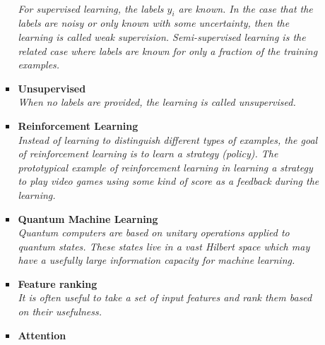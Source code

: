 \documentclass[12pt,letterpaper]{article}
\begin{document}
\begin{itemize}
\begin{itemize}
\begin{itemize}
				\\\textit{For supervised learning, the labels $y_i$ are known.  In the case that the labels are noisy or only known with some uncertainty, then the learning is called weak supervision.  Semi-supervised learning is the related case where labels are known for only a fraction of the training examples.}
				\item \textbf{Unsupervised}~\cite{Sheldon:2024sbe,Cai:2024xnt,Lu:2024ict,Kishimoto:2023cys,Badea:2023jdb,Kitouni:2023rct,Huang:2023kgs,Dillon:2021gag,Howard:2021pos,Cai:2020vzx,Dillon:2019cqt,1797846,Komiske:2019fks,Mackey:2015hwa}
				\\\textit{When no labels are provided, the learning is called unsupervised.}
				\item \textbf{Reinforcement Learning}~\cite{Nishimura:2024apb,Angloher:2023oya,Alvestad:2023jgl,Nishimura:2023wdu,Dersy:2022bym,Windisch:2021mem,Cranmer:2021gdt,Harvey:2021oue,John:2020sak,Brehmer:2020brs,Carrazza:2019efs}
				\\\textit{Instead of learning to distinguish different types of examples, the goal of reinforcement learning is to learn a strategy (policy).  The prototypical example of reinforcement learning in learning a strategy to play video games using some kind of score as a feedback during the learning.}
				\item \textbf{Quantum Machine Learning}~\cite{Scott:2024txs,Yang:2024bqw,Nelakurti:2024xol,Zhang:2024ebl,Lazar:2024luq,Chen:2024rna,Hoque:2023zjt,Hammad:2023wme,Rehm:2023ovj,Schuhmacher:2023pro,Wozniak:2023xbe,Rousselot:2023pcj,Duckett:2022ccc,Araz:2022zxk,Peixoto:2022zzk,Alvi:2022fkk,Delgado:2022aty,Araz:2022haf,Abel:2022lqr,Gianelle:2022unu,Ngairangbam:2021yma,Kim:2021wrr,Bravo-Prieto:2021ehz,Araz:2021ifk,Belis:2021zqi,Wu:2021xsj,Heredge:2021vww,Blance:2021gcs,Chen:2021ouz,Guan:2020bdl,Wu:2020cye,Chen:2020zkj,Terashi:2020wfi,Blance:2020nhl,Zlokapa:2019lvv,Mott:2017xdb}
				\\\textit{Quantum computers are based on unitary operations applied to quantum states.  These states live in a vast Hilbert space which may have a usefully large information capacity for machine learning.}
				\item \textbf{Feature ranking}~\cite{Das:2022cjl,Grojean:2020ech,Faucett:2020vbu}
				\\\textit{It is often useful to take a set of input features and rank them based on their usefulness.}
				\item \textbf{Attention}~\cite{Kach:2023rqw,Biassoni:2023lih,Qiu:2023ihi,Finke:2023veq,goto2021development}

\end{itemize}
\end{itemize}
\end{itemize}
\end{document}
